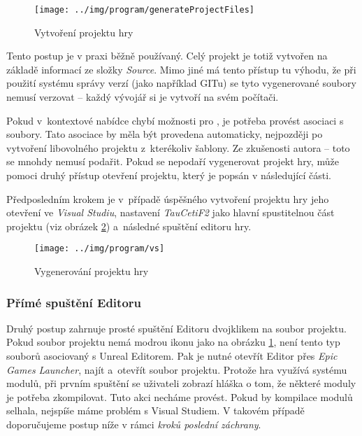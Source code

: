\begin{figure}[!ht]\centering
\texttt{[image: ../img/program/generateProjectFiles]}

\caption{Vytvoření projektu hry}
\label{fig:generateProjectFiles}

\end{figure}
\FloatBarrier

Tento postup je v praxi běžně používaný.  Celý projekt je totiž vytvořen na základě informací ze složky \textit{Source}. Mimo jiné má tento přístup tu výhodu, že při použití systému správy verzí (jako například GITu) se tyto vygenerované soubory nemusí verzovat -- každý vývojář si je vytvoří na svém počítači.

Pokud v~kontextové nabídce chybí možnosti pro \UE{}, je potřeba provést asociaci s~ soubory. Tato asociace by měla být provedena automaticky, nejpozději po vytvoření libovolného \CPP{} projektu z~kterékoliv šablony. Ze zkušenosti autora -- toto se mnohdy nemusí podařit. Pokud se nepodaří vygenerovat projekt hry, může pomoci druhý přístup otevření projektu, který je popsán v následující části.

Předposledním krokem je v~případě úspěšného vytvoření projektu hry jeho otevření ve \textit{Visual Studiu}, nastavení \textit{TauCetiF2} jako hlavní spustitelnou část projektu (viz obrázek \ref{fig:vs}) a~následné spuštění  editoru hry.


\begin{figure}[!ht]\centering
\texttt{[image: ../img/program/vs]}

\caption{Vygenerování projektu hry}
\label{fig:vs}

\end{figure}

\FloatBarrier



\subsubsection{Přímé spuštění Editoru}
Druhý postup zahrnuje prosté spuštění Editoru dvojklikem na soubor projektu. Pokud soubor projektu nemá modrou ikonu jako na obrázku \ref{fig:generateProjectFiles}, není tento typ souborů asociovaný s Unreal Editorem. Pak je nutné otevřít Editor přes \textit{Epic Games Launcher}, najít a~otevřít soubor projektu. Protože hra využívá systému modulů, při prvním spuštění se uživateli zobrazí hláška o tom, že některé moduly je potřeba zkompilovat. Tuto akci necháme provést. Pokud by kompilace modulů selhala, nejspíše máme problém s Visual Studiem. V takovém případě doporučujeme postup níže v rámci \textit{kroků poslední záchrany}.

